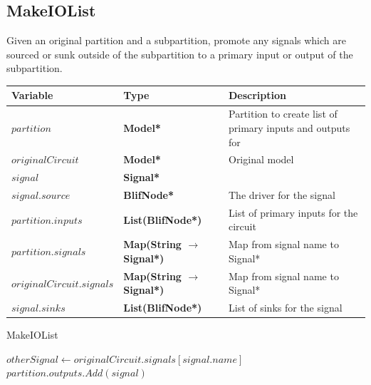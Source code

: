 \documentclass[12pt,final,oneside]{dwThesis} %
\begin{document}
   \newpage \subsection{MakeIOList} Given an original partition and a
   subpartition, promote any signals which are sourced or sunk outside of the
   subpartition to a primary input or output of the subpartition.
   \begin{algorithm} \begin{center} \begin{tabularx}{\linewidth}{llX} \toprule
            Variable & Type & Description\\ \midrule $partition$ &\textbf{
               Model* } &  Partition to create list of primary inputs and
            outputs for\\ $originalCircuit$ &\textbf{  Model* } &  Original
            model \\ $signal$ &\textbf{  Signal* } &  \\ $signal.source$
            &\textbf{  BlifNode* } &  The driver for the signal \\
            $partition.inputs$ &\textbf{  List(BlifNode*) } &  List of primary
            inputs for the circuit \\ $partition.signals$ &\textbf{  Map(String
               $\to$ Signal*) } &  Map from signal name to Signal* \\
            $originalCircuit.signals$ &\textbf{  Map(String $\to$ Signal*) } &
            Map from signal name to Signal* \\ $signal.sinks$ &\textbf{
               List(BlifNode*) } &  List of sinks for the signal \\

            \bottomrule \end{tabularx} \end{center}
      \caption{MakeIOList}\label{makeiolist} \begin{algorithmic}[1]
             
         \EndIf \State $otherSignal \gets originalCircuit.signals[signal.name]$
          \State $partition.outputs.Add(signal)$
         \EndIf \EndFor \EndProcedure \end{algorithmic} \end{algorithm}
   
\end{document}
